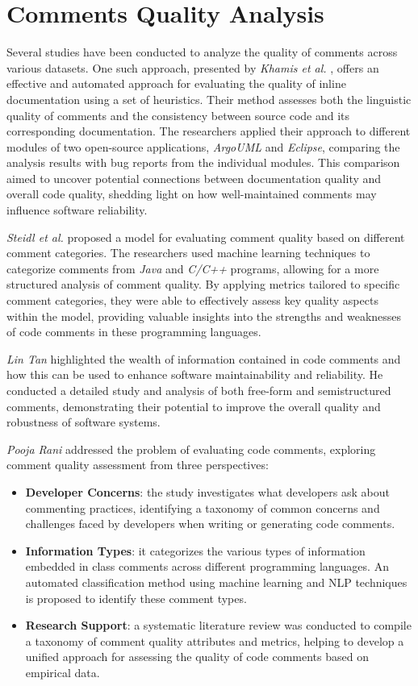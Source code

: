 \section{Comments Quality Analysis}
Several studies have been conducted to analyze the quality of comments across various datasets. One such approach, presented by \textit{Khamis et al.} \cite{javadocMiner}, offers an effective and automated approach for evaluating the quality of inline documentation using a set of heuristics. Their method assesses both the linguistic quality of comments and the consistency between source code and its corresponding documentation. The researchers applied their approach to different modules of two open-source applications, \textit{ArgoUML} and \textit{Eclipse}, comparing the analysis results with bug reports from the individual modules. This comparison aimed to uncover potential connections between documentation quality and overall code quality, shedding light on how well-maintained comments may influence software reliability.

\noindent \textit{Steidl et al.} \cite{steidl2013} proposed a model for evaluating comment quality based on different comment categories. The researchers used machine learning techniques to categorize comments from \textit{Java} and \textit{C/C++} programs, allowing for a more structured analysis of comment quality. By applying metrics tailored to specific comment categories, they were able to effectively assess key quality aspects within the model, providing valuable insights into the strengths and weaknesses of code comments in these programming languages.

\noindent \textit{Lin Tan} \cite{TAN2015493} highlighted the wealth of information contained in code comments and how this can be used to enhance software maintainability and reliability. He conducted a detailed study and analysis of both free-form and semistructured comments, demonstrating their potential to improve the overall quality and robustness of software systems.

\noindent \textit{Pooja Rani} \cite{Rani2021} addressed the problem of evaluating code comments, exploring comment quality assessment from three perspectives:
\begin{itemize}
	\item \textbf{Developer Concerns}: the study investigates what developers ask about commenting practices, identifying a taxonomy of common concerns and challenges faced by developers when writing or generating code comments.
	\item \textbf{Information Types}: it categorizes the various types of information embedded in class comments across different programming languages. An automated classification method using machine learning and NLP techniques is proposed to identify these comment types.
	\item \textbf{Research Support}: a systematic literature review was conducted to compile a taxonomy of comment quality attributes and metrics, helping to develop a unified approach for assessing the quality of code comments based on empirical data.
\end{itemize}

